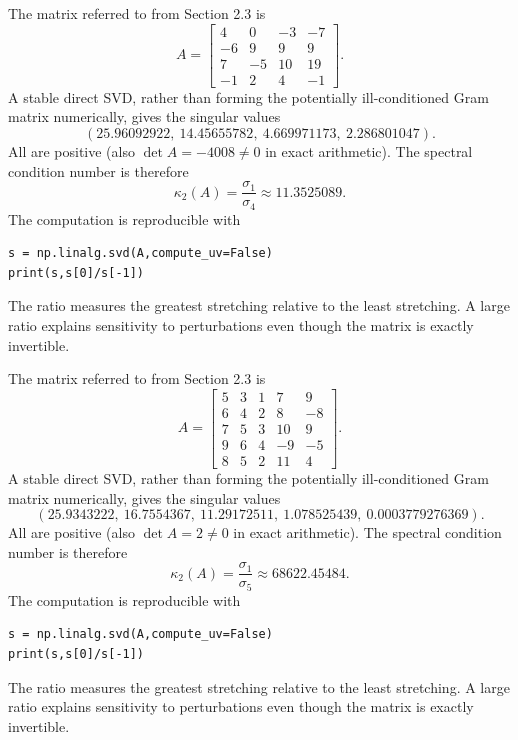 The matrix referred to from Section 2.3 is
\[A=\begin{bmatrix}4&0&-3&-7\\-6&9&9&9\\7&-5&10&19\\-1&2&4&-1\end{bmatrix}.\]
A stable direct SVD, rather than forming the potentially ill-conditioned Gram matrix numerically, gives the singular values
\[(25.96092922,\ 14.45655782,\ 4.669971173,\ 2.286801047).\]
All are positive (also $\det A=-4008\ne0$ in exact arithmetic). The spectral condition number is therefore
\[\kappa_2(A)=\frac{\sigma_1}{\sigma_{4}}\approx 11.3525089.\]
The computation is reproducible with
\begin{verbatim}
s = np.linalg.svd(A,compute_uv=False)
print(s,s[0]/s[-1])
\end{verbatim}
The ratio measures the greatest stretching relative to the least stretching. A large ratio explains sensitivity to perturbations even though the matrix is exactly invertible.

The matrix referred to from Section 2.3 is
\[A=\begin{bmatrix}5&3&1&7&9\\6&4&2&8&-8\\7&5&3&10&9\\9&6&4&-9&-5\\8&5&2&11&4\end{bmatrix}.\]
A stable direct SVD, rather than forming the potentially ill-conditioned Gram matrix numerically, gives the singular values
\[(25.9343222,\ 16.7554367,\ 11.29172511,\ 1.078525439,\ 0.0003779276369).\]
All are positive (also $\det A=2\ne0$ in exact arithmetic). The spectral condition number is therefore
\[\kappa_2(A)=\frac{\sigma_1}{\sigma_{5}}\approx 68622.45484.\]
The computation is reproducible with
\begin{verbatim}
s = np.linalg.svd(A,compute_uv=False)
print(s,s[0]/s[-1])
\end{verbatim}
The ratio measures the greatest stretching relative to the least stretching. A large ratio explains sensitivity to perturbations even though the matrix is exactly invertible.
